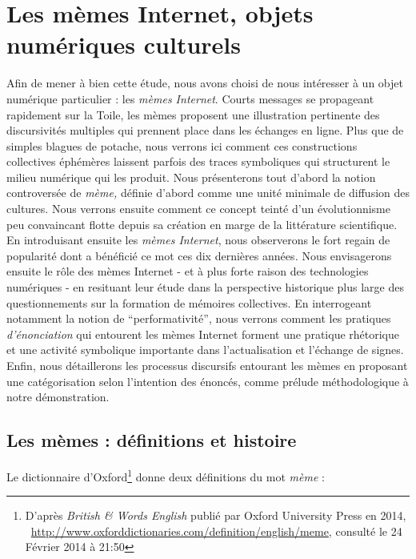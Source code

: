 \chapter[Les m\`emes Internet, objets num\'eriques culturels]{Les m\`emes Internet, objets num\'eriques culturels}

Afin de mener \`a bien cette \'etude, nous avons choisi de nous int\'eresser \`a un objet num\'erique particulier : les \textit{m\`emes Internet}. Courts messages se propageant rapidement sur la Toile, les m\`emes proposent une illustration pertinente des discursivit\'es multiples qui prennent place dans les \'echanges en ligne. Plus que de simples blagues de potache, nous verrons ici comment ces constructions collectives \'eph\'em\`eres laissent parfois des traces symboliques qui structurent le milieu num\'erique qui les produit. Nous pr\'esenterons tout d{\textquoteright}abord la notion controvers\'ee de \textit{m\`eme, }d\'efinie d{\textquoteright}abord comme une unit\'e minimale de diffusion des cultures. Nous verrons ensuite comment ce concept teint\'e d{\textquoteright}un \'evolutionnisme peu convaincant flotte depuis sa cr\'eation en marge de la litt\'erature scientifique. En introduisant ensuite les \textit{m\`emes Internet}, nous observerons le fort regain de popularit\'e dont a b\'en\'efici\'e ce mot ces dix derni\`eres ann\'ees\textit{. }Nous envisagerons ensuite le r\^ole des m\`emes Internet - et \`a plus forte raison des technologies num\'eriques - en resituant leur \'etude dans la perspective historique plus large des questionnements sur la formation de m\'emoires collectives. En interrogeant notamment la notion de {\textquotedblleft}performativit\'e{\textquotedblright}, nous verrons comment les pratiques \textit{d{\textquoteright}\'enonciation }qui entourent les m\`emes Internet forment une pratique rh\'etorique et une activit\'e symbolique importante dans l{\textquoteright}actualisation et l{\textquoteright}\'echange de signes. Enfin, nous d\'etaillerons les processus discursifs entourant les m\`emes en proposant une cat\'egorisation selon l{\textquoteright}intention des \'enonc\'es, comme pr\'elude m\'ethodologique \`a notre d\'emonstration.

\section[Les m\`emes : d\'efinitions et histoire ]{Les m\`emes : d\'efinitions et histoire } 

Le dictionnaire d{\textquoteright}Oxford\footnote{ D{\textquoteright}apr\`es \textit{British \& Words English} publi\'e par Oxford University Press en 2014, \ \url{http://www.oxforddictionaries.com/definition/english/meme}, consult\'e le 24 F\'evrier 2014 \`a 21:50} donne deux d\'efinitions du mot \textit{m\`eme }: 

